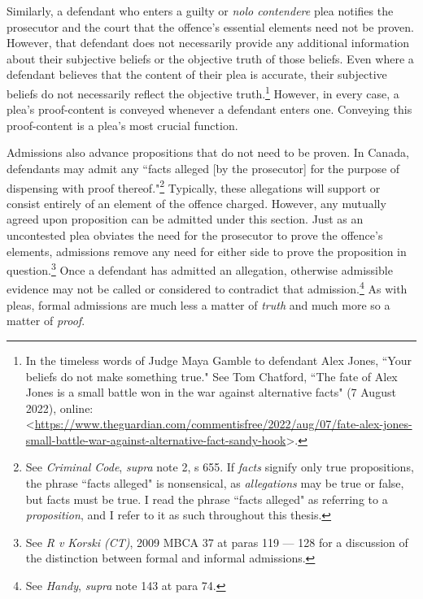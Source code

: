 Similarly, a defendant who enters a guilty or \textit{nolo contendere} plea notifies the prosecutor and the court that the offence's essential elements need not be proven. However, that defendant does not necessarily provide any additional information about their subjective beliefs or the objective truth of those beliefs. Even where a defendant believes that the content of their plea is accurate, their subjective beliefs do not necessarily reflect the objective truth.\footnote{In the timeless words of Judge Maya Gamble to defendant Alex Jones, ``Your beliefs do not make something true." See Tom Chatford, ``The fate of Alex Jones is a small battle won in the war against alternative facts" (7 August 2022), online: \textless \url{https://www.theguardian.com/commentisfree/2022/aug/07/fate-alex-jones-small-battle-war-against-alternative-fact-sandy-hook}\textgreater.} However, in every case, a plea's proof-content is conveyed whenever a defendant enters one. Conveying this proof-content is a plea's most crucial function.

Admissions also advance propositions that do not need to be proven. In Canada, defendants may admit any ``facts alleged [by the prosecutor] for the purpose of dispensing with proof thereof."\footnote{See \textit{Criminal Code}, \textit{supra} note 2, s 655. If \textit{facts} signify only true propositions, the phrase ``facts alleged" is nonsensical, as \textit{allegations} may be true or false, but facts must be true. I read the phrase ``facts alleged" as referring to a \textit{proposition}, and I refer to it as such throughout this thesis.} Typically, these allegations will support or consist entirely of an element of the offence charged. However, any mutually agreed upon proposition can be admitted under this section. Just as an uncontested plea obviates the need for the prosecutor to prove the offence's elements, admissions remove any need for either side to prove the proposition in question.\footnote{See \textit{R v Korski (CT)}, 2009 MBCA 37 at paras 119 — 128 for a discussion of the distinction between formal and informal admissions.} Once a defendant has admitted an allegation, otherwise admissible evidence may not be called or considered to contradict that admission.\footnote{See \textit{Handy}, \textit{supra} note 143 at para 74.} As with pleas, formal admissions are much less a matter of \textit{truth} and much more so a matter of \textit{proof}.

